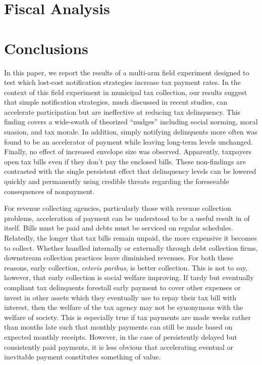 \documentclass[12pt,titlepage]{article}
\begin{document}
\section{Fiscal Analysis}

\section{Conclusions}

In this paper, we report the results of a multi-arm field experiment 
designed to test which lost-cost notification strategies increase tax 
payment rates. In the context of this field experiment in municipal 
tax collection, our results suggest that simple notification strategies, 
much discussed in recent studies, can accelerate participation but are 
ineffective at reducing tax delinquency. This finding covers a 
wide-swath of theorized “nudges” including social norming, moral suasion, 
and tax morale. In addition, simply notifying delinquents more often was 
found to be an accelerator of payment while leaving long-term levels 
unchanged. Finally, no effect of increased envelope size was observed. 
Apparently, taxpayers open tax bills even if they don’t pay the enclosed 
bills. These non-findings are contrasted with the single persistent effect 
that delinquency levels can be lowered quickly and permanently using 
credible threats regarding the foreseeable consequences of nonpayment. 

For revenue collecting agencies, particularly those with revenue collection 
problems, acceleration of payment can be understood to be a useful result 
in of itself. Bills must be paid and debts must be serviced on regular 
schedules. Relatedly, the longer that tax bills remain unpaid, the more 
expensive it becomes to collect. Whether handled internally or externally 
through debt collection firms, downstream collection practices leave 
diminished revenues. For both these reasons, early collection, 
\textit{ceteris paribus}, is better collection. This is not to say, 
however, that early collection is social welfare improving. If tardy 
but eventually compliant tax delinquents forestall early payment to 
cover other expenses or invest in other assets which they eventually 
use to repay their tax bill with interest, then the welfare of the tax 
agency may not be synonymous with the welfare of society. This is 
especially true if tax payments are made weeks rather than months late 
such that monthly payments can still be made based on expected monthly 
receipts. However, in the case of persistently delayed but consistently 
paid payments, it is less obvious that accelerating eventual or inevitable 
payment constitutes something of value. 
\end{document}
